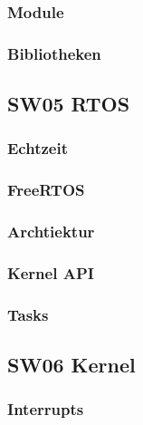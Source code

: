 \documentclass[
  10pt,
  a4paper,
]{article}
\numberwithin{equation}{section}
\begin{document}
\hypertarget{module}{%
\subsubsection{Module}\label{module}}

\hypertarget{bibliotheken}{%
\subsubsection{Bibliotheken}\label{bibliotheken}}

\hypertarget{sw05-rtos}{%
\subsection{SW05 RTOS}\label{sw05-rtos}}

\hypertarget{echtzeit}{%
\subsubsection{Echtzeit}\label{echtzeit}}

\hypertarget{freertos}{%
\subsubsection{FreeRTOS}\label{freertos}}

\hypertarget{archtiektur}{%
\subsubsection{Archtiektur}\label{archtiektur}}

\hypertarget{kernel-api}{%
\subsubsection{Kernel API}\label{kernel-api}}

\hypertarget{tasks}{%
\subsubsection{Tasks}\label{tasks}}

\hypertarget{sw06-kernel}{%
\subsection{SW06 Kernel}\label{sw06-kernel}}

\hypertarget{interrupts}{%
\subsubsection{Interrupts}\label{interrupts}}
\end{document}
